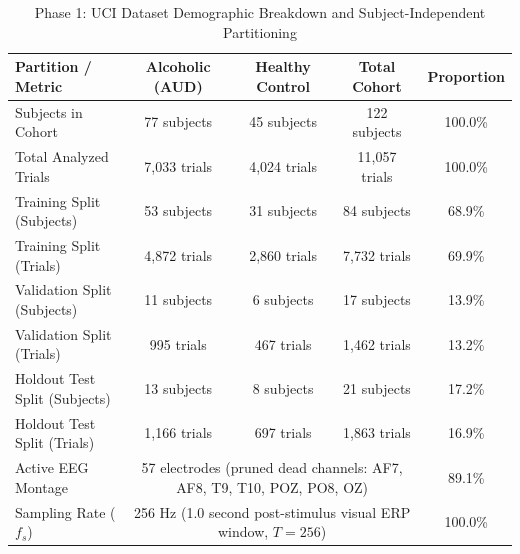 \begin{table}[t]
\centering
\caption{Phase 1: UCI Dataset Demographic Breakdown and Subject-Independent Partitioning}
\label{tab:phase1_dataset}
\begin{tabular}{lcccc}
\hline
\textbf{Partition / Metric} & \textbf{Alcoholic (AUD)} & \textbf{Healthy Control} & \textbf{Total Cohort} & \textbf{Proportion} \\
\hline
Subjects in Cohort & 77 subjects & 45 subjects & 122 subjects & 100.0\% \\
Total Analyzed Trials & 7,033 trials & 4,024 trials & 11,057 trials & 100.0\% \\
\hline
Training Split (Subjects) & 53 subjects & 31 subjects & 84 subjects & 68.9\% \\
Training Split (Trials) & 4,872 trials & 2,860 trials & 7,732 trials & 69.9\% \\
Validation Split (Subjects) & 11 subjects & 6 subjects & 17 subjects & 13.9\% \\
Validation Split (Trials) & 995 trials & 467 trials & 1,462 trials & 13.2\% \\
Holdout Test Split (Subjects) & 13 subjects & 8 subjects & 21 subjects & 17.2\% \\
Holdout Test Split (Trials) & 1,166 trials & 697 trials & 1,863 trials & 16.9\% \\
\hline
Active EEG Montage & \multicolumn{3}{c}{57 electrodes (pruned dead channels: AF7, AF8, T9, T10, POZ, PO8, OZ)} & 89.1\% \\
Sampling Rate ($f_s$) & \multicolumn{3}{c}{256 Hz (1.0 second post-stimulus visual ERP window, $T=256$)} & 100.0\% \\
\hline
\end{tabular}
\end{table}
